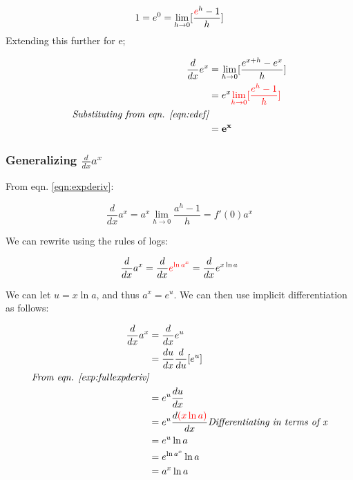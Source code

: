 \documentclass[12pt]{article}
\begin{document}
\begin{equation}\label{eqn:edef}
    \begin{split}
        1 = e^0 = \lim_{h\to 0}[\frac{\textcolor{red}{e}^h-1}{h}]
    \end{split}
\end{equation}
Extending this further for e;

\begin{equation}\label{exp:fullexpderiv}
    \begin{split}
        \frac{d}{dx} e^x &= \lim_{h\to 0}[\frac{e^{x+h}-e^x}{h}]\\
        &= e^x \textcolor{red}{\lim_{h\to 0}[\frac{e^h-1}{h}]}\\
        \textit{Substituting from eqn. \ref{eqn:edef}}\\
        &= \mathbf{e^x}
    \end{split}
\end{equation}

\subsubsection{Generalizing \texorpdfstring{$\frac{d}{dx} a^x$}{the derivative of exponential functions}}

From eqn. \ref{eqn:expderiv}:

$$\frac{d}{dx}a^x = a^x \lim_{h\to 0} \frac{a^h-1}{h} = f'(0) a^x$$

We can rewrite using the rules of logs:

$$\frac{d}{dx}a^x = \frac{d}{dx}\textcolor{red}{ e^{\ln a^x} } = \frac{d}{dx} e^{x\ln a}$$

We can let $u = x \ln a$, and thus $a^x = e^u$. We can then use implicit differentiation as follows:

\begin{equation}\label{exp:derivativeexpa}
    \begin{split}
        \frac{d}{dx} a^x &= \frac{d}{dx} e^u\\
        &=\frac{du}{dx} \frac{d}{du} [e^u]\\
        \textit{From eqn. \ref{exp:fullexpderiv}}\\
        &=e^u \frac{du}{dx}\\
        &= e^u \frac{d \textcolor{red}{(x \ln a)}}{dx}
        \textit{Differentiating in terms of x}\\
        &= e^u \ln a\\
        &= e^{\ln a^x} \ln a\\
        &= a^x \ln a\\
    \end{split}
\end{equation}
\end{document}
